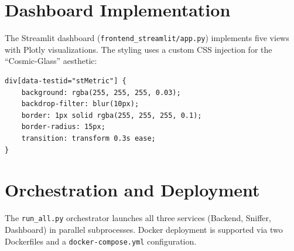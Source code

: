 \section{Dashboard Implementation}

The Streamlit dashboard (\texttt{frontend\_streamlit/app.py}) implements five views with Plotly visualizations. The styling uses a custom CSS injection for the ``Cosmic-Glass'' aesthetic:

\begin{lstlisting}[caption={Cosmic-Glass CSS Injection (excerpt)}, label={lst:css}]
div[data-testid="stMetric"] {
    background: rgba(255, 255, 255, 0.03);
    backdrop-filter: blur(10px);
    border: 1px solid rgba(255, 255, 255, 0.1);
    border-radius: 15px;
    transition: transform 0.3s ease;
}
\end{lstlisting}

\section{Orchestration and Deployment}

The \texttt{run\_all.py} orchestrator launches all three services (Backend, Sniffer, Dashboard) in parallel subprocesses. Docker deployment is supported via two Dockerfiles and a \texttt{docker-compose.yml} configuration.

